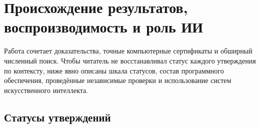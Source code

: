 \section{Происхождение результатов, воспроизводимость и роль ИИ}
\label{sec:origin}

Работа сочетает доказательства, точные компьютерные сертификаты и обширный
численный поиск. Чтобы читатель не восстанавливал статус каждого утверждения по
контексту, ниже явно описаны шкала статусов, состав программного обеспечения,
проведённые независимые проверки и использование систем искусственного
интеллекта.

\subsection{Статусы утверждений}

